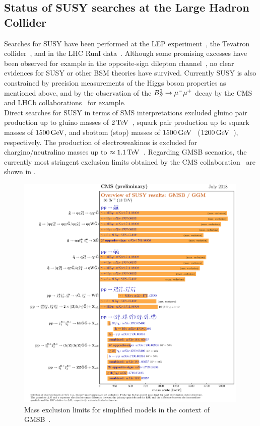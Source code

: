 \subsection{Status of SUSY searches at the Large Hadron Collider}
Searches for SUSY have been performed  at the LEP experiment~\cite{LEP}, the Tevatron collider~\cite{TEVATRON}, and in the LHC RunI data~\cite{ChristianRunI}. Although some promising excesses have been observed for example in the opposite-sign dilepton channel~\cite{Edge}, no clear evidences for SUSY or other BSM theories have survived. Currently SUSY is also constrained by precision measurements of the Higgs boson properties as mentioned above, and by the observation of the $B_S^0\to{\mu^-}{\mu^+}$ decay by the CMS and LHCb collaborations~\cite{B0S} for example.\\
Direct searches for SUSY in terms of SMS interpretations excluded gluino pair production up to gluino masses of $2\,\text{Te\hspace{-.08em}V}$~\cite{GluinoCMS}, squark pair production up to squark masses of $1500\,\text{Ge\hspace{-.08em}V}$, and sbottom (stop) masses of $1500\,\text{Ge\hspace{-.08em}V}$~\cite{sbottom} ($1200\,\text{Ge\hspace{-.08em}V}$~\cite{stop}), respectively. The production of electroweakinos is excluded for chargino/neutralino masses up to $\approx 1.1\,\text{Te\hspace{-.08em}V}$~\cite{EWKinos}.
Regarding GMSB scenarios, the currently most stringent exclusion limits obtained by the CMS collaboration~\cite{CMS} are shown in .
\begin{figure}[tbp]
 \centering
 \includegraphics[width=0.99\textwidth]{figures/general/barplot_GMSB}
 \caption{Mass exclusion limits for simplified models in the context of GMSB~\cite{SUSSummaryPlot}.}
 \label{fig:GMSB_summary}
\end{figure}
